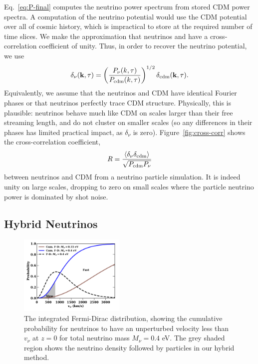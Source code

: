 \documentclass[useAMS, usenatbib]{mnras}
\newcommand{\bs}{\mathbf}
\begin{document}
Eq.~\ref{eq:P-final} computes the neutrino power spectrum from stored CDM power spectra.
A computation of the neutrino potential would use the CDM potential over all of cosmic history, which is impractical
to store at the required number of time slices. We make the approximation that neutrinos and
have a cross-correlation coefficient of unity. Thus, in order to recover the neutrino potential, we use
\begin{equation}
\delta_{\nu}(\bs k, \tau) = \left(\frac{P_{\nu}(k,
    \tau)}{P_{\rm cdm}(k, \tau)}\right)^{1/2} \delta_{\rm cdm}(\bs k, \tau).\label{eq:phases}
\end{equation}
Equivalently, we assume that the neutrinos and CDM have identical Fourier phases or that neutrinos perfectly trace CDM structure.
Physically, this is plausible: neutrinos behave much like CDM on scales larger than their free streaming length,
and do not cluster on smaller scales (so any differences in their phases has limited practical impact, as $\delta_\nu$ is zero).
Figure~\ref{fig:cross-corr} shows the cross-correlation coefficient,
\begin{equation}
R = \frac{\left\langle \delta_\nu \delta_\mathrm{cdm} \right\rangle}{\sqrt{P_{\rm{cdm}} P_{\rm{\nu}}}}
\end{equation}
between neutrinos and CDM from a neutrino particle simulation. It is indeed unity on large scales,
dropping to zero on small scales where the particle neutrino power is dominated by shot noise.

\subsection{Hybrid Neutrinos}
\label{sec:hybrid}

\begin{figure}
\includegraphics[width=0.45\textwidth]{nuplots/fermidirac.pdf}
  \caption{The integrated Fermi-Dirac distribution, showing the cumulative probability for neutrinos to have an unperturbed velocity less than $v_\nu$ at $z=0$ for total neutrino mass $M_\nu = 0.4$ eV.
  The grey shaded region shows the neutrino density followed by particles in our hybrid method.
  }
  \label{fig:fddistribution}
\end{figure}
\end{document}
